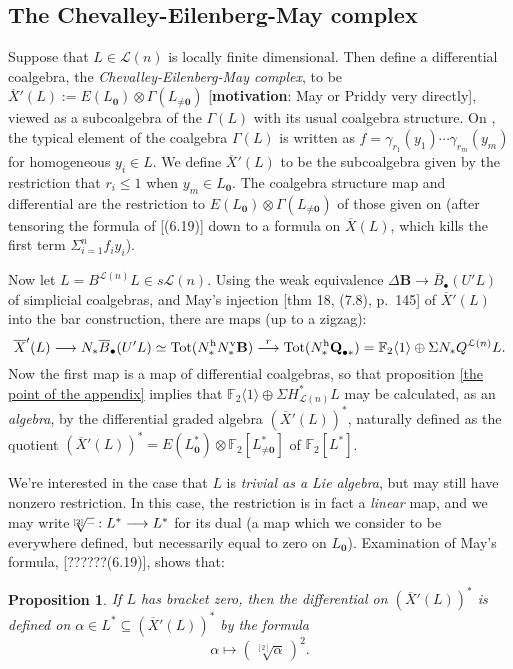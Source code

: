 \documentclass[11pt]{amsart}
\theoremstyle{plain}
\newtheorem{prop}[thm]{Proposition}
\theoremstyle{definition}
\newcommand{\DASH}{\textup{--}}
\renewcommand{\to}{\longrightarrow}
\newcommand{\calL}{\mathcal{L}}
\theoremstyle{plain}
\newcommand{\dualrestn}[1]{\sqrt[{[2]}]{#1}}
\renewcommand{\dualrestn}[1]{\sqrt[{\!\!\![2]}]{#1}}
\newcommand{\UEA}{U'}%
\newcommand{\UEAX}{\overline{X}'}%
\newcommand{\F}{\mathbb{F}}
\begin{document}
\begin{appendices}
\subsection{The Chevalley-Eilenberg-May complex}\label{The Chevalley-Eilenberg-May complex}
Suppose that $L\in\calL(n)$ is locally finite dimensional. Then define a differential coalgebra, the \emph{Chevalley-Eilenberg-May complex}, to be $\UEAX(L):= E(L_{\textbf{0}})\otimes \Gamma(L_{\neq\textbf{0}})$ [\textbf{motivation}: May or Priddy very directly], viewed as a subcoalgebra of the $\Gamma(L)$ with its usual coalgebra structure. On \cite[p. 141]{MayRestLie.pdf}, the typical element of the coalgebra $\Gamma(L)$ is written as $f=\gamma_{r_1}(y_1)\cdots \gamma_{r_m}(y_m)$ for homogeneous $y_i\in L$. We define $\UEAX(L)$ to be the subcoalgebra given by the restriction that $r_i\leq1$ when $y_m\in L_{\textbf{0}}$. The coalgebra structure map and differential are the restriction to $E(L_{\textbf{0}})\otimes \Gamma(L_{\neq\textbf{0}})$ of those given on \cite[p. 141]{MayRestLie.pdf} (after tensoring the formula of [(6.19)] down to a formula on $\overline{X}(L)$, which kills the first term $\Sigma_{i=1}^nf_iy_i$).

Now let $ L=B^{\calL(n)}L\in s\calL(n)$. Using the weak equivalence $\Delta\textbf{B}\to \overline{B}_\bullet(\UEA L)$ of simplicial coalgebras, and  May's injection [thm 18, (7.8), p.\ 145] of $\UEAX(L)$ into the bar construction, there are maps (up to a zigzag):
\[\UEAX(L)\to N_*\overline{B}_\bullet(U'L)\simeq\textup{Tot}(N^\textup{h}_*N^\textup{v}_*\textbf{B})\overset{r}{\to} \textup{Tot}(N^\textup{h}_*\textbf{Q}_{\bullet*})=\F_2\langle 1\rangle\oplus \Sigma N_*Q^{\calL(n)} L.\]
Now the first map is a map of differential coalgebras, so that proposition \ref{the point of the appendix} implies that $\F_2\langle 1\rangle\oplus \Sigma H^*_{\calL(n)}L$ may be calculated, as an \emph{algebra}, by the differential graded algebra $(\UEAX(L))^*$, naturally defined as the quotient $(\UEAX(L))^*=E(L^*_{\textbf{0}}) \otimes\F_2[L_{\neq\textbf{0}}^*]$ of $\F_2[L^*]$.

We're interested in the case that $L$ is \emph{trivial as a Lie algebra}, but may still have nonzero restriction. In this case, the restriction is in fact a \emph{linear} map, and we may write $\dualrestn{\DASH}:L^*\to L^*$ for its dual (a map which we consider to be everywhere defined, but necessarily equal to zero on $L_{\textbf{0}}$). Examination of May's formula, [??????(6.19)], shows that:
\begin{prop}
If $L$ has bracket zero, then the differential on $(\UEAX(L))^*$ is defined on $\alpha\in L^*\subseteq (\UEAX(L))^*$ by the formula
\[\alpha\longmapsto (\!\sqrt[{[2]}]{\alpha}\,)^2.\]


\end{prop}
\end{appendices}
\end{document}
